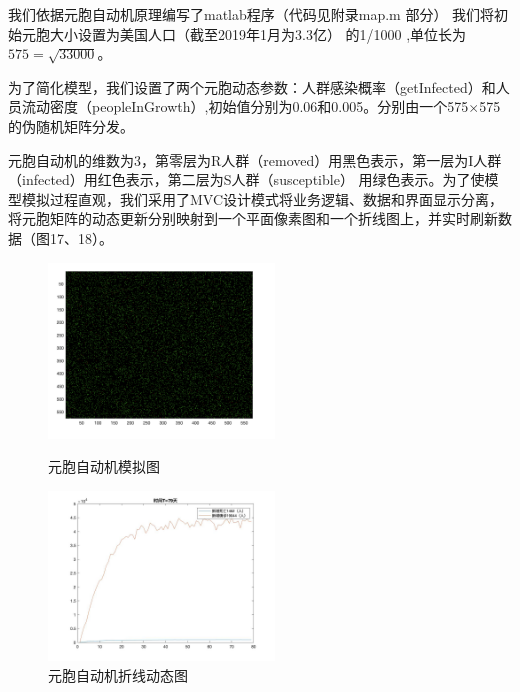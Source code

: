 \documentclass[UTF8]{ctexart}
\begin{document}
我们依据元胞自动机原理编写了matlab程序（代码见附录map.m 部分）
我们将初始元胞大小设置为美国人口（截至2019年1月为3.3亿\cite{bib8}）
的1/1000 ,单位长为$575=\sqrt{33000}$。
\\
\par 
为了简化模型，我们设置了两个元胞动态参数：人群感染概率（getInfected）和人员流动密度（peopleInGrowth）,初始值分别为0.06和0.005。分别由一个575$\times$575的伪随机矩阵分发。
\par
元胞自动机的维数为3，第零层为R人群（removed）用黑色表示，第一层为I人群（infected）用红色表示，第二层为S人群（susceptible） 用绿色表示。为了使模型模拟过程直观，我们采用了MVC设计模式将业务逻辑、数据和界面显示分离，将元胞矩阵的动态更新分别映射到一个平面像素图和一个折线图上，并实时刷新数据（图17、18）。
\\ 
\begin{figure}[htbp]
    \centering
    \begin{minipage}[t]{0.48\textwidth}
    \centering
    \includegraphics[width=6cm]{20.png}
    \caption{元胞自动机模拟图}
    \end{minipage}
    \begin{minipage}[t]{0.48\textwidth}
    \centering
    \includegraphics[width=6cm]{raw.jpg}
    \caption{元胞自动机折线动态图}
    \end{minipage}
    \end{figure}
\end{document}
